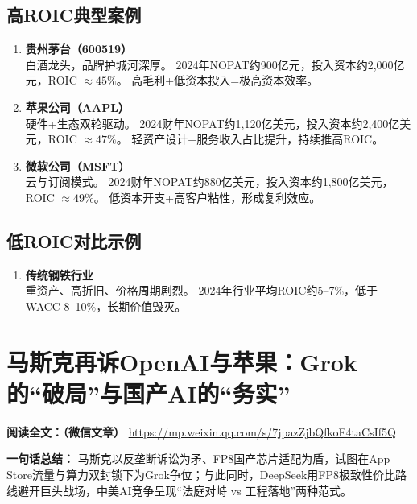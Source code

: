 \subsection{高ROIC典型案例}
\begin{enumerate}[leftmargin=*, nosep]
    \item \textbf{贵州茅台（600519）}  \\
    白酒龙头，品牌护城河深厚。  
    2024年NOPAT约900亿元，投入资本约2,000亿元，ROIC $\approx45\%$。  
    高毛利+低资本投入=极高资本效率。
    
    \item \textbf{苹果公司（AAPL）}  \\
    硬件+生态双轮驱动。  
    2024财年NOPAT约1,120亿美元，投入资本约2,400亿美元，ROIC $\approx47\%$。  
    轻资产设计+服务收入占比提升，持续推高ROIC。

    \item \textbf{微软公司（MSFT）}  \\
    云与订阅模式。  
    2024财年NOPAT约880亿美元，投入资本约1,800亿美元，ROIC $\approx49\%$。  
    低资本开支+高客户粘性，形成复利效应。
\end{enumerate}

\subsection{低ROIC对比示例}
\begin{enumerate}[leftmargin=*, nosep]
    \item \textbf{传统钢铁行业}  \\
    重资产、高折旧、价格周期剧烈。  
    2024年行业平均ROIC约5–7\%，低于WACC 8–10\%，长期价值毁灭。
\end{enumerate}

\clearpage

\section{马斯克再诉OpenAI与苹果：Grok的“破局”与国产AI的“务实”}
\vspace{1cm}
\noindent\textbf{阅读全文：（微信文章）} \url{https://mp.weixin.qq.com/s/7jpazZjbQfkoF4taCsIf5Q}

\textbf{一句话总结：}  
马斯克以反垄断诉讼为矛、FP8国产芯片适配为盾，试图在App Store流量与算力双封锁下为Grok争位；与此同时，DeepSeek用FP8极致性价比路线避开巨头战场，中美AI竞争呈现“法庭对峙 vs 工程落地”两种范式。

